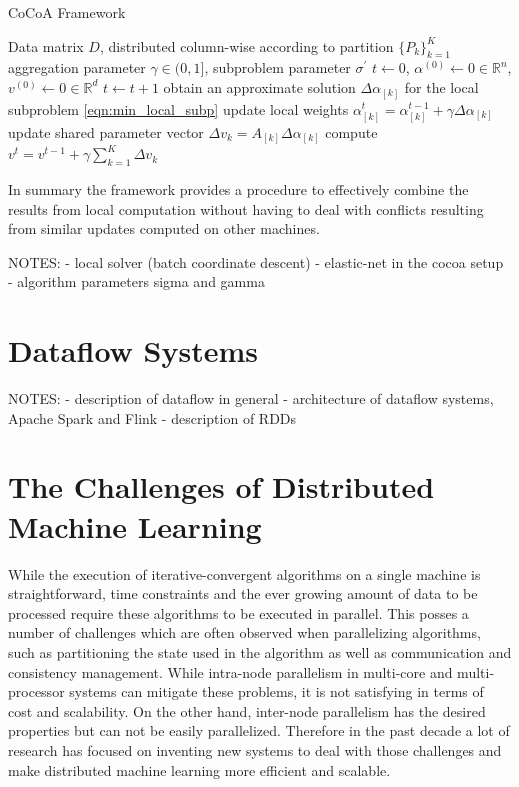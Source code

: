 \begin{algorithm}
\caption{CoCoA Framework}\label{alg:cocoa}
\begin{algorithmic}[1]{}
\DATA Data matrix $D$, distributed column-wise according to partition $\{P_k\}_{k=1}^K$
\INPUT aggregation parameter $\gamma \in (0,1]$, subproblem parameter $\sigma^\prime$
\INIT $t \gets 0$, $\alpha^{(0)} \gets 0 \in \mathbb{R}^n$, $v^{(0)} \gets 0 \in \mathbb{R}^d$ 
\Repeat
\State $t \gets t + 1$
\State obtain an approximate solution $\Delta\alpha_{[k]}$ for the local subproblem \ref{eqn:min_local_subp}
\State update local weights $\alpha_{[k]}^{t} = \alpha_{[k]}^{t-1} + \gamma\Delta\alpha_{[k]}$
\State update shared parameter vector $\Delta v_k = A_{[k]}\Delta\alpha_{[k]}$
\EndFor
\State compute $v^{t} = v^{t-1} + \gamma\sum_{k=1}^K\Delta v_k$
\end{algorithmic}
\end{algorithm}
In summary the framework provides a procedure to effectively combine the results from local computation without having to deal with conflicts resulting from similar updates computed on other machines.

NOTES:
- local solver (batch coordinate descent)
- elastic-net in the cocoa setup
- algorithm parameters sigma and gamma


\section{Dataflow Systems}
\label{s:dataflow}
NOTES:
- description of dataflow in general
- architecture of dataflow systems, Apache Spark and Flink
- description of RDDs

\section{The Challenges of Distributed Machine Learning}
\label{s:distributed_ml}
While the execution of iterative-convergent algorithms on a single machine is straightforward, time constraints and the ever growing amount of data to be processed require these algorithms to be executed in parallel.
This posses a number of challenges which are often observed when parallelizing algorithms, such as partitioning the state used in the algorithm as well as communication and consistency management.
While intra-node parallelism in multi-core and multi-processor systems can mitigate these problems, it is not satisfying in terms of cost and scalability.
On the other hand, inter-node parallelism has the desired properties but can not be easily parallelized.
Therefore in the past decade a lot of research has focused on inventing new systems to deal with those challenges and make distributed machine learning more efficient and scalable.


